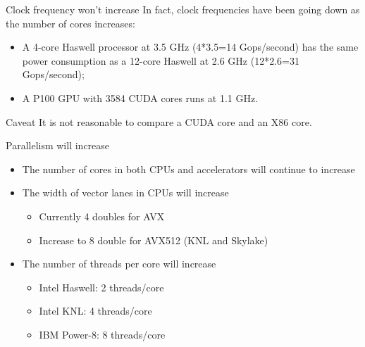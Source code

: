 \documentclass[aspectratio=43]{beamer}
\begin{document}
\begin{frame}[fragile]{Clock frequency won't increase}
    In fact, clock frequencies have been going down as the number of cores increases:
    \begin{itemize}
        \item A 4-core Haswell processor at 3.5 GHz (4*3.5=14 Gops/second) has the same power consumption as a 12-core Haswell at 2.6 GHz (12*2.6=31 Gops/second);
        \item A P100 GPU with 3584 CUDA cores runs at 1.1 GHz.
    \end{itemize}

    \begin{info}{Caveat}
        It is not reasonable to compare a CUDA core and an X86 core.
    \end{info}
\end{frame}

\begin{frame}[fragile]{Parallelism will increase}
    \begin{itemize}
        \item The number of cores in both CPUs and accelerators will continue to increase
        \item The width of vector lanes in CPUs will increase
        \begin{itemize}
            \item Currently 4 doubles for AVX
            \item Increase to 8 double for AVX512 (KNL and Skylake)
        \end{itemize}
        \item The number of threads per core will increase
        \begin{itemize}
            \item Intel Haswell: 2 threads/core
            \item Intel KNL: 4 threads/core
            \item IBM Power-8: 8 threads/core
        \end{itemize}
    \end{itemize}
\end{frame}

\end{document}

